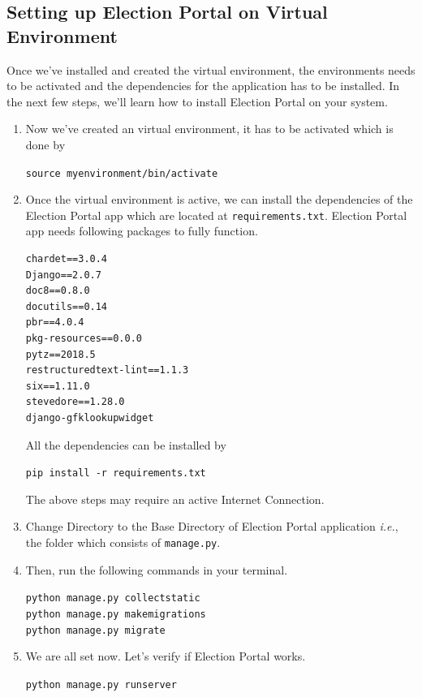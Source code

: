 \documentclass[12pt, a4paper, titlepage]{article}
\begin{document}
\subsection{Setting up Election Portal on Virtual Environment}
Once we've installed and created the virtual environment, the environments needs to be activated and the dependencies for the application has to be installed. In the next few steps, we'll learn how to install Election Portal on your system.
\begin{enumerate}
\item Now we've created an virtual environment, it has to be activated which is done by
\begin{center}
\verb|source myenvironment/bin/activate|
\end{center}

\item Once the virtual environment is active, we can install the dependencies of the Election Portal app which are located at \verb|requirements.txt|. Election Portal app needs following packages to fully function. 
\begin{lstlisting}
chardet==3.0.4
Django==2.0.7
doc8==0.8.0
docutils==0.14
pbr==4.0.4
pkg-resources==0.0.0
pytz==2018.5
restructuredtext-lint==1.1.3
six==1.11.0
stevedore==1.28.0
django-gfklookupwidget
\end{lstlisting}
All the dependencies can be installed by
\begin{center}
\verb|pip install -r requirements.txt|
\end{center} 
The above steps may require an active Internet Connection. 

\item Change Directory to the Base Directory of Election Portal application \textit{i.e.}, the folder which consists of \verb|manage.py|.

\item Then, run the following commands in your terminal.
\begin{center}
   \verb|python manage.py collectstatic| \\
   \verb|python manage.py makemigrations|\\
   \verb|python manage.py migrate|\\
\end{center}

\item We are all set now. Let's verify if Election Portal works.
\begin{center}
   \verb|python manage.py runserver| \\
\end{center}
\end{enumerate}  
\newpage
\end{document}

